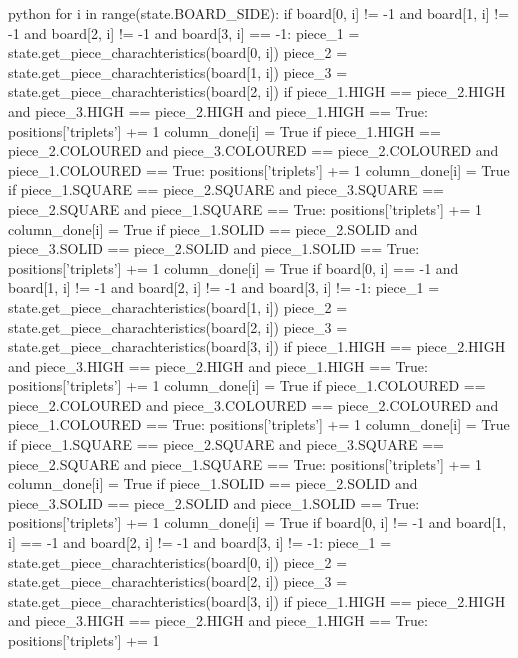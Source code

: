 \begin{mintedbox}{python}
    for i in range(state.BOARD_SIDE):
        if board[0, i] != -1 and board[1, i] != -1 and board[2, i] != -1 and board[3, i] == -1:
            piece_1 = state.get_piece_charachteristics(board[0, i])
            piece_2 = state.get_piece_charachteristics(board[1, i])
            piece_3 = state.get_piece_charachteristics(board[2, i])
            if piece_1.HIGH == piece_2.HIGH and piece_3.HIGH == piece_2.HIGH and piece_1.HIGH == True:
                positions['triplets'] += 1
                column_done[i] = True
            if piece_1.HIGH == piece_2.COLOURED and piece_3.COLOURED == piece_2.COLOURED and piece_1.COLOURED == True:
                positions['triplets'] += 1
                column_done[i] = True
            if piece_1.SQUARE == piece_2.SQUARE and piece_3.SQUARE == piece_2.SQUARE and piece_1.SQUARE == True:
                positions['triplets'] += 1
                column_done[i] = True
            if piece_1.SOLID == piece_2.SOLID and piece_3.SOLID == piece_2.SOLID and piece_1.SOLID == True:
                positions['triplets'] += 1
                column_done[i] = True
        if board[0, i] == -1 and board[1, i] != -1 and board[2, i] != -1 and board[3, i] != -1:
            piece_1 = state.get_piece_charachteristics(board[1, i])
            piece_2 = state.get_piece_charachteristics(board[2, i])
            piece_3 = state.get_piece_charachteristics(board[3, i])
            if piece_1.HIGH == piece_2.HIGH and piece_3.HIGH == piece_2.HIGH and piece_1.HIGH == True:
                positions['triplets'] += 1
                column_done[i] = True
            if piece_1.COLOURED == piece_2.COLOURED and piece_3.COLOURED == piece_2.COLOURED and piece_1.COLOURED == True:
                positions['triplets'] += 1
                column_done[i] = True
            if piece_1.SQUARE == piece_2.SQUARE and piece_3.SQUARE == piece_2.SQUARE and piece_1.SQUARE == True:
                positions['triplets'] += 1
                column_done[i] = True
            if piece_1.SOLID == piece_2.SOLID and piece_3.SOLID == piece_2.SOLID and piece_1.SOLID == True:
                positions['triplets'] += 1
                column_done[i] = True
        if board[0, i] != -1 and board[1, i] == -1 and board[2, i] != -1 and board[3, i] != -1:
            piece_1 = state.get_piece_charachteristics(board[0, i])
            piece_2 = state.get_piece_charachteristics(board[2, i])
            piece_3 = state.get_piece_charachteristics(board[3, i])
            if piece_1.HIGH == piece_2.HIGH and piece_3.HIGH == piece_2.HIGH and piece_1.HIGH == True:
                positions['triplets'] += 1

\end{mintedbox}
